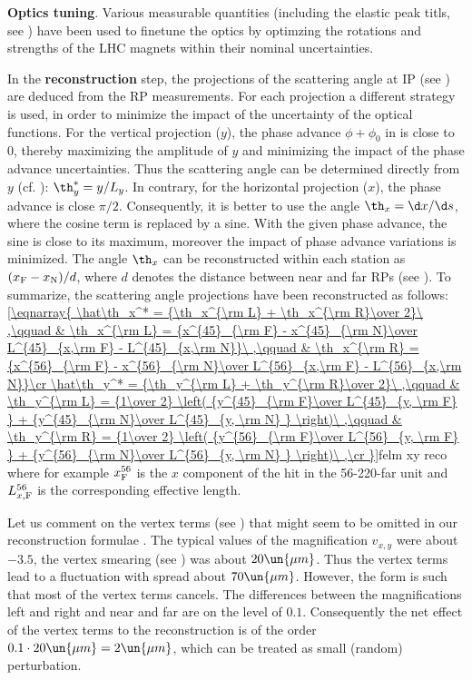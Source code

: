 \> {\bf Optics tuning}. Various measurable quantities (including the elastic peak titls, see ) have been used to finetune the optics by optimzing the rotations and strengths of the LHC magnets within their nominal uncertainties.

\> In the {\bf reconstruction} step, the projections of the scattering angle at IP (see ) are deduced from the RP measurements. For each projection a different strategy is used, in order to minimize the impact of the uncertainty of the optical functions. For the vertical projection ($y$), the phase advance $\phi+\phi_0$ in  is close to $0$, thereby maximizing the amplitude of $y$ and minimizing the impact of the phase advance uncertainties. Thus the scattering angle can be determined directly from $y$ (cf. ): $\th_y^* = y/L_y$. In contrary, for the horizontal projection ($x$), the phase advance is close $\pi/2$. Consequently, it is better to use the angle $\th_x = \d x/\d s$, where the cosine term is replaced by a sine. With the given phase advance, the sine is close to its maximum, moreover the impact of phase advance variations is minimized. The angle $\th_x$ can be reconstructed within each station as $(x_{\rm F} - x_{\rm N}) / d$, where $d$ denotes the distance between near and far RPs (see ). To summarize, the scattering angle projections have been reconstructed as follows:
\eqref{\eqnarray{
	\hat\th_x^* = {\th_x^{\rm L} + \th_x^{\rm R}\over 2}\ ,\qquad
		& \th_x^{\rm L} = {x^{45}_{\rm F} - x^{45}_{\rm N}\over L^{45}_{x,\rm F} - L^{45}_{x,\rm N}}\ ,\qquad
		& \th_x^{\rm R} = {x^{56}_{\rm F} - x^{56}_{\rm N}\over L^{56}_{x,\rm F} - L^{56}_{x,\rm N}}\cr
	\hat\th_y^* = {\th_y^{\rm L} + \th_y^{\rm R}\over 2}\ ,\qquad
		& \th_y^{\rm L} = {1\over 2} \left( {y^{45}_{\rm F}\over L^{45}_{y, \rm F} } + {y^{45}_{\rm N}\over L^{45}_{y, \rm N} } \right)\ ,\qquad
		& \th_y^{\rm R} = {1\over 2} \left( {y^{56}_{\rm F}\over L^{56}_{y, \rm F} } + {y^{56}_{\rm N}\over L^{56}_{y, \rm N} } \right)\ ,\cr
}}{felm xy reco}
where for example $x^{56}_{\rm F}$ is the $x$ component of the hit in the 56-220-far unit and $L^{56}_{x, \rm F}$ is the corresponding effective length. 

\par\parindent\itindent\indent\hang
Let us comment on the vertex terms (see ) that might seem to be omitted in our reconstruction formulae . The typical values of the magnification $v_{x, y}$ were about $-3.5$, the vertex smearing (see ) was about $20\un{\mu m}$. Thus the vertex terms lead to a fluctuation with spread about $70\un{\mu m}$. However, the form  is such that most of the vertex terms cancels. The differences between the magnifications left and right and near and far are on the level of $0.1$. Consequently the net effect of the vertex terms to the reconstruction is of the order $0.1 \cdot 20\un{\mu m} = 2\un{\mu m}$, which can be treated as small (random) perturbation.

